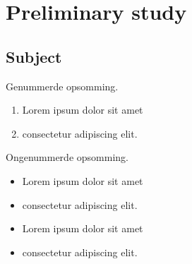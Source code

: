 
\section{Preliminary study} %
\label{sec:preliminary-study}

\subsection{Subject} %
\label{sub:subject}

\lipsum[1]

Genummerde opsomming.

\begin{enumerate}
  \item Lorem ipsum dolor sit amet
  \item consectetur adipiscing elit.
\end{enumerate}

Ongenummerde opsomming.

\begin{itemize}
  \item Lorem ipsum dolor sit amet
  \item consectetur adipiscing elit.
  \item Lorem ipsum dolor sit amet
  \item consectetur adipiscing elit.
\end{itemize}
